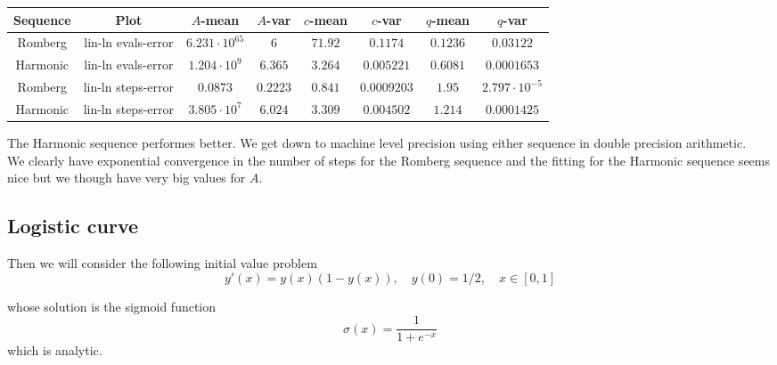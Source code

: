 \begin{table}[H]
    \centering
    \small
    \begin{tabular}{c|c||c|c|c|c|c|c}
Sequence & Plot & \(A\)-mean & \(A\)-var & \(c\)-mean & \(c\)-var & \(q\)-mean & \(q\)-var\\\hline
Romberg & lin-ln evals-error & \(6.231\cdot 10^{65}\) & \(6\) & \(71.92\) & \(0.1174\) & \(0.1236\) & \(0.03122\) \\
Harmonic & lin-ln evals-error & \(1.204\cdot 10^9\) & \(6.365\) & \(3.264\) & \(0.005221\) & \(0.6081\) & \(0.0001653\) \\
Romberg & lin-ln steps-error & \(0.0873\) & \(0.2223\) & \(0.841\) & \(0.0009203\) & \(1.95\) & \(2.797\cdot 10^{-5}\) \\
Harmonic & lin-ln steps-error & \(3.805\cdot 10^7\) & \(6.024\) & \(3.309\) & \(0.004502\) & \(1.214\) & \(0.0001425\) \\
    \end{tabular}
    \label{tab:my_label}
\end{table}

The Harmonic sequence performes better. We get down to machine level precision using either sequence in double precision arithmetic.\\

We clearly have exponential convergence in the number of steps for the Romberg sequence and the fitting for the Harmonic sequence seems nice but we though have very big values for \(A\).

\subsection{Logistic curve}

Then we will consider the following initial value problem
\begin{equation}\label{43}
y'(x) = y(x)(1-y(x)),\quad y(0) = 1/2, \quad x\in [0,1]
\end{equation}

whose solution is the sigmoid function
\[
\sigma(x) = \frac{1}{1 + e^{-x}}
\]
which is analytic.

